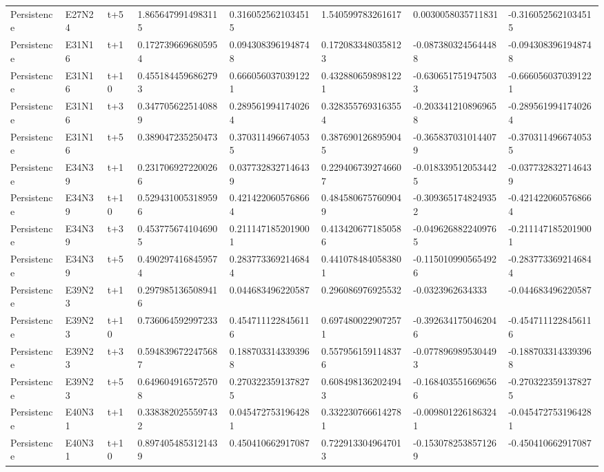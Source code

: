 \begin{landscape}
\begin{longtable}{llllllll}
Persistence & E27N24 & t+5 & 1.8656479914983115 & 0.3160525621034515 & 1.540599783261617 & 0.0030058035711831 & -0.3160525621034515 \\
Persistence & E31N16 & t+1 & 0.1727396696805954 & 0.0943083961948748 & 0.1720833480358123 & -0.0873803245644488 & -0.0943083961948748 \\
Persistence & E31N16 & t+10 & 0.4551844596862793 & 0.6660560370391221 & 0.4328806598981221 & -0.6306517519475033 & -0.6660560370391221 \\
Persistence & E31N16 & t+3 & 0.3477056225140889 & 0.2895619941740264 & 0.3283557693163554 & -0.2033412108969658 & -0.2895619941740264 \\
Persistence & E31N16 & t+5 & 0.389047235250473 & 0.3703114966740535 & 0.3876901268959045 & -0.3658370310144079 & -0.3703114966740535 \\
Persistence & E34N39 & t+1 & 0.2317069272200266 & 0.0377328327146439 & 0.2294067392746607 & -0.0183395120534425 & -0.0377328327146439 \\
Persistence & E34N39 & t+10 & 0.5294310053189596 & 0.4214220605768664 & 0.4845806757609049 & -0.3093651748249352 & -0.4214220605768664 \\
Persistence & E34N39 & t+3 & 0.4537756741046905 & 0.2111471852019001 & 0.4134206771850586 & -0.0496268822409765 & -0.2111471852019001 \\
Persistence & E34N39 & t+5 & 0.4902974168459574 & 0.2837733692146844 & 0.4410784840583801 & -0.1150109905654926 & -0.2837733692146844 \\
Persistence & E39N23 & t+1 & 0.2979851365089416 & 0.044683496220587 & 0.296086976925532 & -0.0323962634333 & -0.044683496220587 \\
Persistence & E39N23 & t+10 & 0.736064592997233 & 0.4547111228456116 & 0.6974800229072571 & -0.3926341750462046 & -0.4547111228456116 \\
Persistence & E39N23 & t+3 & 0.5948396722475687 & 0.1887033143393968 & 0.5579561591148376 & -0.0778969895304493 & -0.1887033143393968 \\
Persistence & E39N23 & t+5 & 0.6496049165725708 & 0.2703223591378275 & 0.6084981362024943 & -0.1684035516696566 & -0.2703223591378275 \\
Persistence & E40N31 & t+1 & 0.3383820255597432 & 0.0454727531964281 & 0.3322307666142781 & -0.0098012261863241 & -0.0454727531964281 \\
Persistence & E40N31 & t+10 & 0.8974054853121439 & 0.450410662917087 & 0.7229133049647013 & -0.1530782538571269 & -0.450410662917087 \\

\end{longtable}
\end{landscape}
